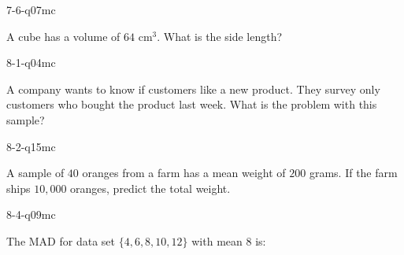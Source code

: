 \begin{practiceQuestion}{7-6-q07}{mc}
\begin{questionText}
A cube has a volume of $64$ cm$^3$. What is the side length?
\end{questionText}
\end{practiceQuestion}

\begin{practiceQuestion}{8-1-q04}{mc}
\begin{questionText}
A company wants to know if customers like a new product. They survey only customers who bought the product last week. What is the problem with this sample?
\end{questionText}
\end{practiceQuestion}

\begin{practiceQuestion}{8-2-q15}{mc}
\begin{questionText}
A sample of $40$ oranges from a farm has a mean weight of $200$ grams. If the farm ships $10{,}000$ oranges, predict the total weight.
\end{questionText}
\end{practiceQuestion}

\begin{practiceQuestion}{8-4-q09}{mc}
\begin{questionText}
The MAD for data set $\{4, 6, 8, 10, 12\}$ with mean $8$ is:
\end{questionText}
\end{practiceQuestion}

